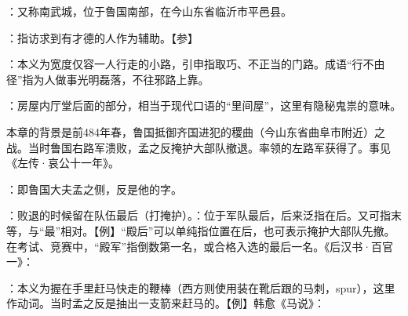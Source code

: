 {
\item {}：又称南武城，位于鲁国南部，在今山东省临沂市平邑县。
\item {}：指访求到有才德的人作为辅助。【参】
\item {}：本义为宽度仅容一人行走的小路，引申指取巧、不正当的门路。成语“行不由径”指为人做事光明磊落，不往邪路上靠。
\item {}：房屋内厅堂后面的部分，相当于现代口语的“里间屋”，这里有隐秘鬼祟的意味。
}
{}  %


{本章的背景是前484年春，鲁国抵御齐国进犯的稷曲（今山东省曲阜市附近）之战。当时鲁国右路军溃败，孟之反掩护大部队撤退。率领的左路军获得了。事见《左传·哀公十一年》。
\begin{lyitemize}
\item {}：即鲁国大夫孟之侧，反是他的字。
\item {}：败退的时候留在队伍最后（打掩护）。：位于军队最后，后来泛指在后。又可指末等，与“最”相对。【例】“殿后”可以单纯指位置在后，也可表示掩护大部队先撤。在考试、竞赛中，“殿军”指倒数第一名，或合格入选的最后一名。《后汉书·百官一》：
\item {}：本义为握在手里赶马快走的鞭棒（西方则使用装在靴后跟的马刺，spur），这里作动词。当时孟之反是抽出一支箭来赶马的。【例】韩愈《马说》：
\end{lyitemize}
}
{}


